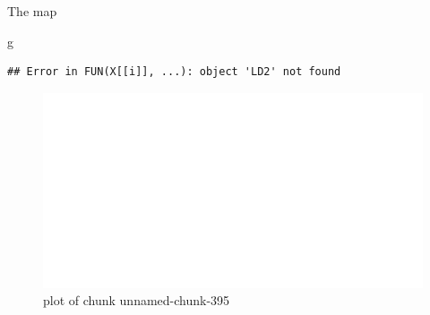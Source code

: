 \documentclass[ignorenonframetext,]{beamer}
\newenvironment{Shaded}{\begin{snugshade}}{\end{snugshade}}
\newcommand{\NormalTok}[1]{#1}
\begin{document}
\begin{frame}[fragile]{The map}
\protect\hypertarget{the-map}{}

\begin{Shaded}
\begin{Highlighting}[]
\NormalTok{g}
\end{Highlighting}
\end{Shaded}

\begin{verbatim}
## Error in FUN(X[[i]], ...): object 'LD2' not found
\end{verbatim}

\begin{figure}
\centering
\includegraphics{figure/unnamed-chunk-395-1.pdf}
\caption{plot of chunk unnamed-chunk-395}
\end{figure}

\end{frame}
\end{document}
